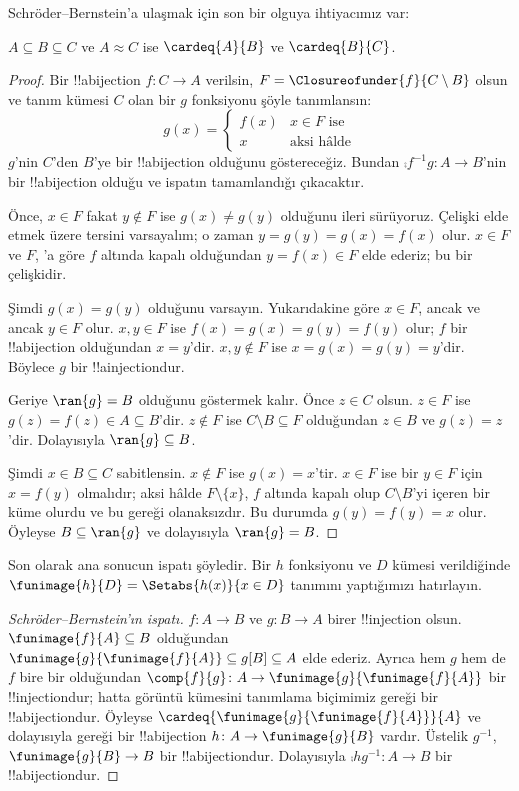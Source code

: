 Schr\"oder--Bernstein'a ulaşmak için son bir olguya ihtiyacımız var:

\begin{prop}
$A\subseteq B\subseteq C$ ve $A\approx C$ ise $\cardeq{A}{B}$ ve
$\cardeq{B}{C}$.
\end{prop}

\begin{proof}
Bir !!a{bijection} $f\colon C\to A$ verilsin,
$F=\Closureofunder{f}{C\setminus B}$ olsun ve tanım kümesi $C$ olan bir $g$
fonksiyonu şöyle tanımlansın:
\[
	g(x) =
	\begin{cases}
			f(x) &\text{$x \in F$ ise}\\
			x & \text{aksi hâlde}
		\end{cases}
\]
$g$'nin $C$'den $B$'ye bir !!a{bijection} olduğunu göstereceğiz. Bundan
$\comp{f^{-1}}{g}\colon A\to B$'nin bir !!a{bijection} olduğu ve ispatın
tamamlandığı çıkacaktır.

Önce, $x\in F$ fakat $y\notin F$ ise $g(x)\neq g(y)$ olduğunu ileri sürüyoruz.
Çelişki elde etmek üzere tersini varsayalım; o zaman
$y=g(y)=g(x)=f(x)$ olur. $x\in F$ ve $F$,
'a göre $f$ altında kapalı olduğundan
$y=f(x)\in F$ elde ederiz; bu bir çelişkidir.

Şimdi $g(x)=g(y)$ olduğunu varsayın. Yukarıdakine göre $x\in F$, ancak ve
ancak $y\in F$ olur. $x,y\in F$ ise $f(x)=g(x)=g(y)=f(y)$ olur; $f$ bir
!!a{bijection} olduğundan $x=y$'dir. $x,y\notin F$ ise
$x=g(x)=g(y)=y$'dir. Böylece $g$ bir !!a{injection}{}dur.

Geriye $\ran{g}=B$ olduğunu göstermek kalır. Önce $z\in C$ olsun.
$z\in F$ ise $g(z)=f(z)\in A\subseteq B$'dir. $z\notin F$ ise
$C\setminus B\subseteq F$ olduğundan $z\in B$ ve $g(z)=z$'dir. Dolayısıyla
$\ran{g}\subseteq B$.

Şimdi $x\in B\subseteq C$ sabitlensin. $x\notin F$ ise $g(x)=x$'tir.
$x\in F$ ise bir $y\in F$ için $x=f(y)$ olmalıdır; aksi hâlde
$F\setminus\{x\}$, $f$ altında kapalı olup $C\setminus B$'yi içeren bir
küme olurdu ve bu  gereği olanaksızdır. Bu durumda
$g(y)=f(y)=x$ olur. Öyleyse $B\subseteq\ran{g}$ ve dolayısıyla
$\ran{g}=B$.
\end{proof}

Son olarak ana sonucun ispatı şöyledir. Bir $h$ fonksiyonu ve $D$ kümesi
verildiğinde $\funimage{h}{D}=\Setabs{h(x)}{x\in D}$ tanımını yaptığımızı
hatırlayın.

\begin{proof}[Schr\"oder--Bernstein'ın ispatı] $f\colon A\to B$ ve
$g\colon B\to A$ birer !!{injection} olsun. $\funimage{f}{A}\subseteq B$
olduğundan
$\funimage{g}{\funimage{f}{A}}\subseteq g[B]\subseteq A$ elde ederiz.
Ayrıca hem $g$ hem de $f$ bire bir olduğundan
$\comp{f}{g}\colon A\to\funimage{g}{\funimage{f}{A}}$ bir
!!{injection}{}dur; hatta görüntü kümesini tanımlama biçimimiz gereği bir
!!a{bijection}{}dur. Öyleyse
$\cardeq{\funimage{g}{\funimage{f}{A}}}{A}$ ve dolayısıyla
 gereği bir !!a{bijection}
$h\colon A\to\funimage{g}{B}$ vardır. Üstelik $g^{-1}$,
$\funimage{g}{B}\to B$ bir !!a{bijection}{}dur. Dolayısıyla
$\comp{h}{g^{-1}}\colon A\to B$ bir !!a{bijection}{}dur.
\end{proof}

